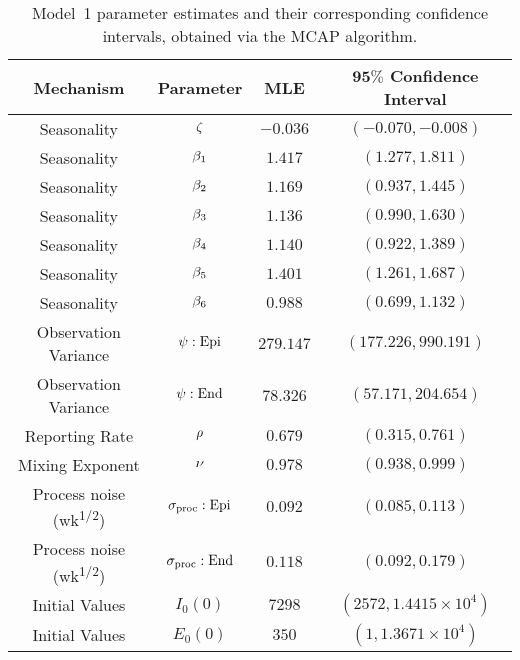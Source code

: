 \begin{table}[!h]
\centering
\caption[Model~1 parameter estimates and confidence intervals.]{\label{tab:mod1CI}Model~1 parameter estimates and their corresponding confidence intervals, obtained via the MCAP algorithm.}
\vspace{2mm}
\begin{tabular}{|c|c|c|c|}
\hline
\textbf{Mechanism} & \textbf{Parameter} & \textbf{MLE} & $\bm{95\%}$ \textbf{Confidence Interval}
\\
\hline
\hline

 Seasonality & $\zeta$ & $-0.036$
   &
  $(-0.070, -0.008)$
\\
\hline

 Seasonality & $\beta_1$ & $1.417$
   &
  $(1.277, 1.811)$
\\
\hline

 Seasonality & $\beta_2$ & $1.169$
   &
  $(0.937, 1.445)$
\\
\hline

 Seasonality & $\beta_3$ & $1.136$
   &
  $(0.990, 1.630)$
\\
\hline

 Seasonality & $\beta_4$ & $1.140$
   &
  $(0.922, 1.389)$
\\
\hline

 Seasonality & $\beta_5$ & $1.401$
   &
  $(1.261, 1.687)$
\\
\hline

 Seasonality & $\beta_6$ & $0.988$
   &
  $(0.699, 1.132)$
\\
\hline

 Observation Variance & $\psi: \mathrm{Epi}$ & $279.147$
   &
  $(177.226, 990.191)$
\\
\hline

 Observation Variance & $\psi: \mathrm{End}$ & $78.326$
   &
  $(57.171, 204.654)$
\\
\hline

  Reporting Rate & $\rho$ & $0.679$
   &
  $(0.315, 0.761)$
\\
\hline

  Mixing Exponent & $\nu$ & $0.978$
   &
  $(0.938, 0.999)$
\\
\hline

  Process noise {\small (wk\textsuperscript{1/2})} & $\sigma_{\mathrm{proc}}: \mathrm{Epi}$ & $0.092$
   &
  $(0.085, 0.113)$
\\
\hline

  Process noise {\small (wk\textsuperscript{1/2})} & $\sigma_{\mathrm{proc}}: \mathrm{End}$ & $0.118$
   &
  $(0.092, 0.179)$
\\
\hline

  Initial Values & $I_{0}(0)$ & $7298$
   &
  $(2572, \ensuremath{1.4415\times 10^{4}})$
\\
\hline

  Initial Values & $E_{0}(0)$ & $350$
   &
  $(1, \ensuremath{1.3671\times 10^{4}})$
\\
\hline

\end{tabular}
\end{table}

